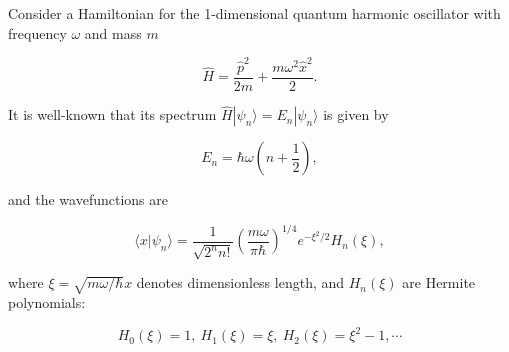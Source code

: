 
Consider a Hamiltonian for the 1-dimensional quantum harmonic oscillator with frequency $\omega$ and mass $m$

\begin{equation}
    \hat{H} = \frac{\hat{p}^2}{2m} + \frac{m\omega^2\hat{x}^2}{2}.
\end{equation}

It is well-known that its spectrum $\hat{H}|\psi_n\rangle=E_n|\psi_n\rangle$ is given by

\begin{equation}
    E_n = \hbar\omega\left(n+\frac{1}{2}\right),
\end{equation}

and the wavefunctions are

\begin{equation}
    \langle x|\psi_n \rangle = \frac{1}{\sqrt{2^n n!}}\left(\frac{m\omega}{\pi\hbar}\right)^{1/4}e^{-\xi^2/2}H_n(\xi),
\end{equation}

where $\xi=\sqrt{m\omega/\hbar}x$ denotes dimensionless length, and $H_n(\xi)$ are Hermite polynomials:

\begin{equation}
    H_0(\xi) = 1,\ H_1(\xi) = \xi,\ H_2(\xi) = \xi^2-1,\cdots
\end{equation}
